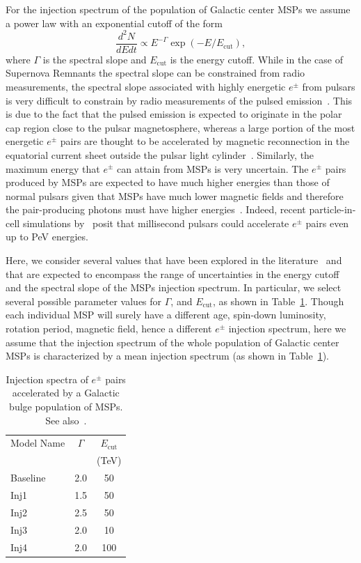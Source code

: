 \documentclass[doublespace,nopageskip]{VTthesis} %
\begin{document}
For the injection spectrum of the population of Galactic center MSPs we 
assume a power law with an exponential cutoff of the form 
\begin{equation}
  \label{eq:mspspectrum}
  \dfrac{d^2N}{dEdt} \propto E^{-\Gamma}\exp(-E/E_{\text{cut}}),
\end{equation}
where $\Gamma$ is the spectral slope and $E_{\text{cut}}$ is the energy cutoff. While in the case of Supernova Remnants the spectral slope can be constrained from radio measurements, the spectral slope associated with highly energetic $e^\pm$ from pulsars is very difficult to constrain by radio measurements of the pulsed emission~\citep{Delahaye:2010}. This is due to the fact that the pulsed emission is expected to originate in the polar cap region close to the pulsar magnetosphere, whereas a large portion of the most energetic $e^\pm$ pairs are thought to be accelerated by magnetic reconnection in the equatorial current sheet outside the pulsar light cylinder~\citep{Cerutti:2015hvk}. Similarly, the maximum energy that $e^{\pm}$ can attain from MSPs is very uncertain. The $e^\pm$ pairs produced by MSPs are expected to have much higher energies than those of normal pulsars given that MSPs have much lower magnetic fields and therefore the pair-producing photons must have higher energies~\citep{Harding:2021yuv}. Indeed, recent particle-in-cell simulations by~\citep{Guepin:2019fjb} posit that millisecond pulsars could accelerate $e^\pm$ pairs even up to PeV energies.

Here, we consider several values that have been explored in the literature~\citep[e.g.,][]{Yuan:2014yda,Song:2019nrx,Guepin:2019fjb} and that are expected to encompass the range of uncertainties in the energy cutoff and the spectral slope of the MSPs injection spectrum. In particular, we select several possible parameter values for $\Gamma$, and $E_{\text{cut}}$, as shown in Table~\ref{tab:mspspectrum}. Though each individual MSP will surely have a different age, spin-down luminosity, rotation period, magnetic field, hence a different $e^\pm$ injection spectrum, here we assume that the injection spectrum of the whole population of Galactic center MSPs is characterized by a mean injection spectrum (as shown in Table~\ref{tab:mspspectrum}).

\begin{table}[htb]
    \centering
    \caption{Injection spectra of $e^{\pm}$ pairs accelerated by a Galactic bulge population of MSPs. See also~\citep{Song:2019nrx}.}
    \begin{tabular}{lcc}
    \toprule
    Model Name&$\Gamma$ & $E_{\text{cut}}$\\
    & &  (TeV) \\
    \midrule
    Baseline &2.0 & 50 \\
    Inj1&1.5 & 50 \\
    Inj2&2.5 & 50 \\
    Inj3&2.0 & 10 \\
    Inj4&2.0 & 100\\
    \bottomrule
    \end{tabular}
    \label{tab:mspspectrum}
\end{table}
\end{document}
